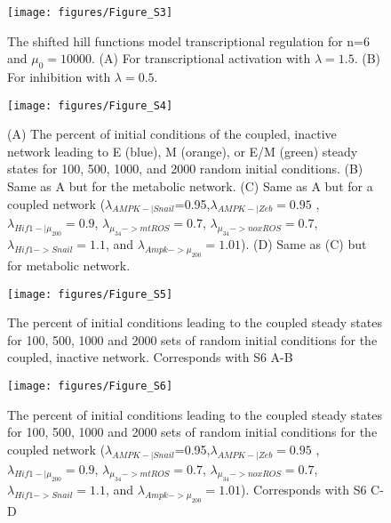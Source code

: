 \documentclass{article}
\begin{document}
\begin{figure}
\texttt{[image: figures/Figure\_S3]}
\caption{The shifted hill functions model transcriptional regulation for n=6 and $\mu_0=10000$. (A) For transcriptional activation with $\lambda = 1.5$. (B) For inhibition with $\lambda=0.5$.}
\end{figure}



\begin{figure}
\texttt{[image: figures/Figure\_S4]}
\caption{(A) The percent of initial conditions of the coupled, inactive network leading to E (blue), M (orange), or E/M (green) steady states for 100, 500, 1000, and 2000 random initial conditions. (B) Same as A but for the metabolic network. (C) Same as A but for a coupled network ($\lambda_{AMPK-|Snail}$=0.95,$\lambda_{AMPK-|Zeb}=0.95$ , $\lambda_{Hif1-|\mu_{200}}=0.9$, $\lambda_{\mu_{34}->mtROS}=0.7$, $\lambda_{\mu_{34}->noxROS}=0.7$, $\lambda_{Hif1->Snail}=1.1$, and $\lambda_{Ampk->\mu_{200}} = 1.01$). (D) Same as (C) but for metabolic network.}
\end{figure}


\begin{figure}
\texttt{[image: figures/Figure\_S5]}
\caption{The percent of initial conditions leading to the coupled steady states for 100, 500, 1000 and 2000 sets of random initial conditions for the coupled, inactive network. Corresponds with S6 A-B}
\end{figure}

\begin{figure}
\texttt{[image: figures/Figure\_S6]}
\caption{The percent of initial conditions leading to the coupled steady states for 100, 500, 1000 and 2000 sets of random initial conditions for the coupled network ($\lambda_{AMPK-|Snail}$=0.95,$\lambda_{AMPK-|Zeb}=0.95$ , $\lambda_{Hif1-|\mu_{200}}=0.9$, $\lambda_{\mu_{34}->mtROS}=0.7$, $\lambda_{\mu_{34}->noxROS}=0.7$, $\lambda_{Hif1->Snail}=1.1$, and $\lambda_{Ampk->\mu_{200}} = 1.01$). Corresponds with S6 C-D }
\end{figure}
\end{document}
